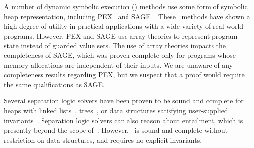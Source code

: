 A number of dynamic symbolic execution (\dsetxt{}) methods use some form 
of symbolic heap representation, including PEX~\cite{Tillmann:2008} and SAGE~\cite{Elkarablieh:2009}. These~\dsetxt{} methods have shown a high degree of utility in practical applications with a wide variety of real-world programs. However, PEX and SAGE use array theories to represent program state instead of guarded value sets. The use of array theories impacts the completeness of SAGE, which was proven complete only for programs whose memory allocations are independent of their inputs. We are unaware of any completeness results regarding PEX, but we suspect that a proof would require the same qualifications as SAGE. 

Several separation logic solvers have been proven to be sound and complete for heaps with linked lists~\cite{Navarro:2011,Cook:2011,Berdine:2005}, trees~\cite{Piskac:2014}, or data structures satisfying user-supplied invariants~\cite{Brotherston:2014}. Separation logic solvers can also reason about entailment, which is presently beyond the scope of~\symtxt{}. However,~\symtxt{} is sound and complete without restriction on data structures, and requires no explicit invariants.







%
%
%

%
%
%
%
%
